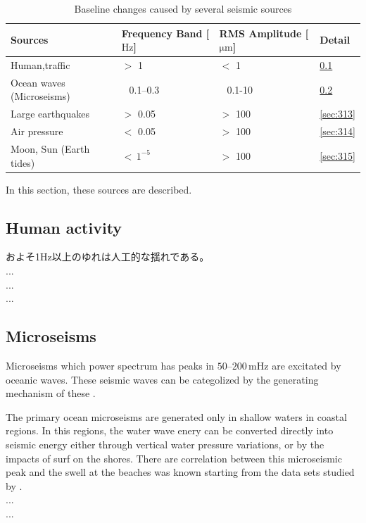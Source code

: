 \begin{table}[H]
  \centering
  \caption{Baseline changes caused by several seismic sources}
  \begin{tabular}{llll}
    \hline
    Sources & Frequency Band [$\mathrm{Hz}$]  & RMS Amplitude [$\mathrm{\mu m}$] & Detail\\
    \hline
    Human,traffic            & $>$ 1             & $<$ 1         & \cref{sec:311}\\
    Ocean waves (Microseisms)& $\ \ $ 0.1--0.3   & $\ \ $ 0.1-10 & \cref{sec:312}\\
    Large earthquakes        & $>$ 0.05          & $>$ 100       & \cref{sec:313}\\    
    Air pressure             & $<$ 0.05          & $>$ 100       & \cref{sec:314}\\
    Moon, Sun (Earth tides)  & $<\, 1^{-5}$      & $>$ 100       & \cref{sec:315}\\
    \hline
  \end{tabular}\label{tb:310}
\end{table}


In this section, these sources are described.

\subsection{Human activity} \label{sec:311}
およそ1Hz以上のゆれは人工的な揺れである。
\\
...\\
...\\
...\\

\subsection{Microseisms} \label{sec:312}
Microseisms which power spectrum has peaks in $50$--$200\,\mathrm{mHz}$ are excitated by oceanic waves. These seismic waves can be categolized by the generating mechanism of these \cite{Bormann2012new}.

The primary ocean microseisms are generated only in shallow waters in coastal regions. In this regions, the water wave enery can be converted directly into seismic energy either through vertical water pressure variations, or by the impacts of surf on the shores. There are correlation between this microseismic peak and the swell at the beaches was known starting from the data sets studied by \cite{haubrich1963comparative}.
\\
...\\
...\\

